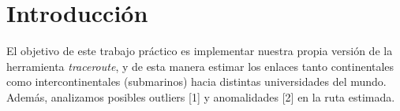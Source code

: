 
\section{Introducción}
El objetivo de este trabajo práctico es implementar nuestra propia versión de la herramienta \textit{traceroute}, y de esta manera estimar los enlaces tanto continentales como intercontinentales (submarinos) hacia distintas universidades del mundo. Además, analizamos posibles outliers [1] y anomalidades [2] en la ruta estimada.